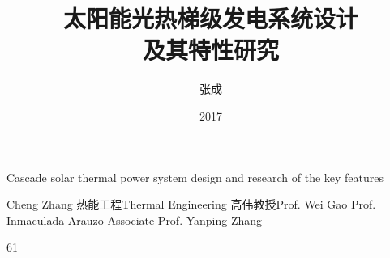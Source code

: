 \makenomenclature

\title{太阳能光热梯级发电系统设计\\及其特性研究}{Cascade solar thermal power system design and research of the key features}
\author
{张成}{Cheng Zhang}
\major
{热能工程}{Thermal Engineering}
\supervisor
{高伟\hspace{0.2em}教授}{Prof. Wei Gao \newline Prof. Inmaculada Arauzo \newline Associate Prof. Yanping Zhang}
\date{2017}{6}{1}